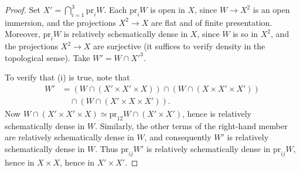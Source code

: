 \begin{proof}
Set \(X'=\bigcap_{i=1}^3\mathrm{pr}_i W\).
Each \(\mathrm{pr}_i W\) is open
in \(X\), since \(W\to X^2\)
is an open immersion, and the
projections \(X^2\to X\) are
flat and of finite presentation.
Moreover, \(\mathrm{pr}_i W\)
is relatively schematically
dense in \(X\), since \(W\)
is so in \(X^2\), and the
projections \(X^2\to X\) are
surjective (it suffices to
verify density in the topological
sense). Take \(W'=W\cap X'^3\).

To verify that (i) is true, note that
\[
\begin{aligned}
W'&=(W\cap(X'\times X'\times X))
\cap(W\cap(X\times X'\times X'))\\
&\quad\cap(W\cap(X'\times X\times X')).
\end{aligned}
\]
Now \(W\cap(X'\times X'\times X)
\simeq\mathrm{pr}_{12}W\cap(X'\times X')\),
hence is relatively schematically
dense in \(W\).
Similarly, the other terms of
the right-hand member are
relatively schematically dense
in \(W\), and consequently
\(W'\) is relatively schematically
dense in \(W\).
Thus \(\mathrm{pr}_{ij}W'\)
is relatively schematically
dense in \(\mathrm{pr}_{ij}W\),
hence in \(X\times X\), hence
in \(X'\times X'\).


\end{proof}
